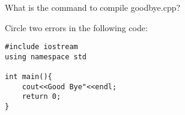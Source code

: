 \documentclass[addpoints,12pt]{exam}
\begin{document}

\begin{center}
\end{center}
\vspace{0.1in}
\begin{center}
\gradetable[h][questions]
\end{center}

\begin{questions}
\question [5]
 What is the command to compile goodbye.cpp?
\vspace{3in}

\question [5]
Circle two errors in the following code:
\begin{lstlisting}
#include iostream
using namespace std
	
int main(){
	cout<<Good Bye"<<endl;
	return 0;
}
\end{lstlisting}

\end{questions}
\end{document}
